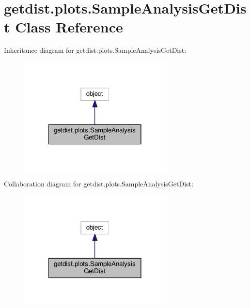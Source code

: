 \hypertarget{classgetdist_1_1plots_1_1SampleAnalysisGetDist}{}\section{getdist.\+plots.\+Sample\+Analysis\+Get\+Dist Class Reference}
\label{classgetdist_1_1plots_1_1SampleAnalysisGetDist}


Inheritance diagram for getdist.\+plots.\+Sample\+Analysis\+Get\+Dist\+:
\nopagebreak
\begin{figure}[H]
\begin{center}
\leavevmode
\includegraphics[width=222pt]{classgetdist_1_1plots_1_1SampleAnalysisGetDist__inherit__graph}
\end{center}
\end{figure}


Collaboration diagram for getdist.\+plots.\+Sample\+Analysis\+Get\+Dist\+:
\nopagebreak
\begin{figure}[H]
\begin{center}
\leavevmode
\includegraphics[width=222pt]{classgetdist_1_1plots_1_1SampleAnalysisGetDist__coll__graph}
\end{center}
\end{figure}
